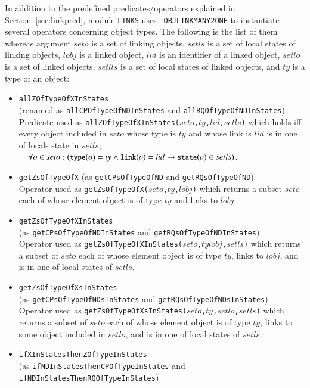 \documentclass[12pt]{report}
\newcommand{\ra}{\rightarrow}
\newcommand{\mbstt}[1]{\mbox{\small{\tt {#1}}}}
\newcommand{\stt}[1]{{\small{\tt {#1}}}}
\begin{document}
In addition to the predefined predicates/operators explained in
Section~\ref{sec:linkpred}, module {\tt LINKS} uses {\tt
  OBJLINKMANY2ONE} to instantiate several operators concerning object
types. The following is the list of them whereas argument $seto$ is a
set of linking objects, $setls$ is a set of local states of linking
objects, $lobj$ is a linked object, $lid$ is an identifier of a linked
object, $setlo$ is a set of linked objects, $setlls$ is a set of local
states of linked objects, and $ty$ is a type of an object:
\begin{itemize}
\item \stt{allZOfTypeOfXInStates}\\
  (renamed as \stt{allCPOfTypeOfNDInStates} and \stt{allRQOfTypeOfNDInStates})\\
  Predicate used as
  \stt{allZOfTypeOfXInStates($seto$,$ty$,$lid$,$setls$)} which holds
  iff every object included in $seto$ whose type is $ty$ and whose
  link is $lid$ is in one of locals state in $setls$;\\$~~~~\forall
  o\in
  seto:(\mbstt{type}(o)=ty\land\mbstt{link}(o)=lid\ra\mbstt{state}(o)\in
  setls)$.
\item \stt{getZsOfTypeOfX} (as \stt{getCPsOfTypeOfND} and \stt{getRQsOfTypeOfND})\\
  Operator used as \stt{getZsOfTypeOfX($seto$,$ty$,$lobj$)} which
  returns a subset $seto$ each of whose element object is of type $ty$
  and links to $lobj$.
\item \stt{getZsOfTypeOfXInStates}\\
  (as \stt{getCPsOfTypeOfNDInStates} and \stt{getRQsOfTypeOfNDInStates})\\
  Operator used as
  \stt{getZsOfTypeOfXInStates($seto$,$ty$$lobj$,$setls$)} which
  returns a subset of $seto$ each of whose element object is of type
  $ty$, links to $lobj$, and is in one of local states of $setls$.
\item \stt{getZsOfTypeOfXsInStates}\\
  (as \stt{getCPsOfTypeOfNDsInStates} and \stt{getRQsOfTypeOfNDsInStates})\\
  Operator used as
  \stt{getZsOfTypeOfXsInStates($seto$,$ty$,$setlo$,$setls$)} which
  returns a subset of $seto$ each of whose element object is of type
  $ty$, links to some object included in $setlo$, and is in one of
  local states of $setls$.
\item \stt{ifXInStatesThenZOfTypeInStates}\\
(as \stt{ifNDInStatesThenCPOfTypeInStates} and \stt{ifNDInStatesThenRQOfTypeInStates})\\

\end{itemize}
\end{document}

